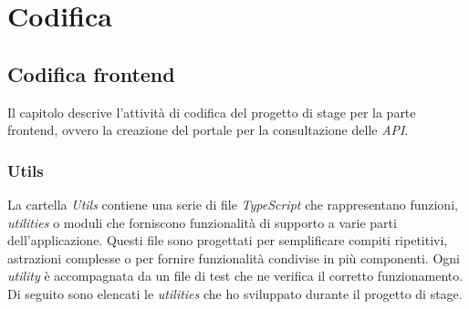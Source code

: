 \chapter{Codifica}\label{cap:codifica}


\section{Codifica frontend}\label{sec:codifica-front-end}
Il capitolo descrive l'attività di codifica del progetto di stage per la parte frontend, ovvero la creazione del portale per la consultazione delle \textit{API}.

\subsection{Utils}\label{subsec:utils}
La cartella \textit{Utils} contiene una serie di file \textit{TypeScript} che rappresentano funzioni, \textit{utilities} o moduli che forniscono funzionalità di supporto a varie parti dell'applicazione.
Questi file sono progettati per semplificare compiti ripetitivi, astrazioni complesse o per fornire funzionalità condivise in più componenti. Ogni \textit{utility} è accompagnata 
da un file di test che ne verifica il corretto funzionamento.\\
Di seguito sono elencati le \textit{utilities} che ho sviluppato durante il progetto di stage.

